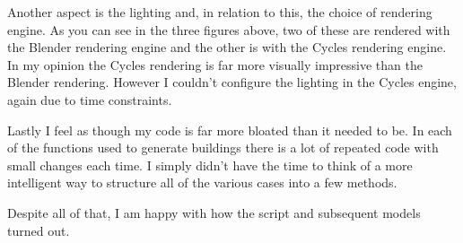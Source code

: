 \documentclass{article}
\begin{document}
Another aspect is the lighting and, in relation to this, the choice of rendering engine. As you can see in the three figures above, two of these are rendered with the Blender rendering engine and the other is with the Cycles rendering engine. In my opinion the Cycles rendering is far more visually impressive than the Blender rendering. However I couldn't configure the lighting in the Cycles engine, again due to time constraints. 

Lastly I feel as though my code is far more bloated than it needed to be. In each of the functions used to generate buildings there is a lot of repeated code with small changes each time. I simply didn't have the time to think of a more intelligent way to structure all of the various cases into a few methods. 

Despite all of that, I am happy with how the script and subsequent models turned out. 
\end{document}
